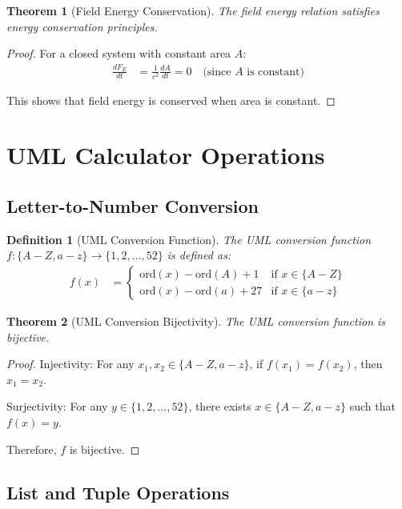 \documentclass[12pt,a4paper]{article}
\newtheorem{definition}{Definition}
\newtheorem{theorem}{Theorem}
\begin{document}
\begin{theorem}[Field Energy Conservation]
The field energy relation satisfies energy conservation principles.
\end{theorem}

\begin{proof}
For a closed system with constant area $A$:
\begin{align}
\frac{dF_E}{dt} &= \frac{1}{c^2} \frac{dA}{dt} = 0 \quad \text{(since } A \text{ is constant)}
\end{align}

This shows that field energy is conserved when area is constant.
\end{proof}

\section{UML Calculator Operations}

\subsection{Letter-to-Number Conversion}

\begin{definition}[UML Conversion Function]
The UML conversion function $f: \{A-Z, a-z\} \rightarrow \{1, 2, \ldots, 52\}$ is defined as:
\begin{align}
f(x) &= \begin{cases}
\text{ord}(x) - \text{ord}(A) + 1 & \text{if } x \in \{A-Z\} \\
\text{ord}(x) - \text{ord}(a) + 27 & \text{if } x \in \{a-z\}
\end{cases}
\end{align}
\end{definition}

\begin{theorem}[UML Conversion Bijectivity]
The UML conversion function is bijective.
\end{theorem}

\begin{proof}
Injectivity: For any $x_1, x_2 \in \{A-Z, a-z\}$, if $f(x_1) = f(x_2)$, then $x_1 = x_2$.

Surjectivity: For any $y \in \{1, 2, \ldots, 52\}$, there exists $x \in \{A-Z, a-z\}$ such that $f(x) = y$.

Therefore, $f$ is bijective.
\end{proof}

\subsection{List and Tuple Operations}
\end{document}

